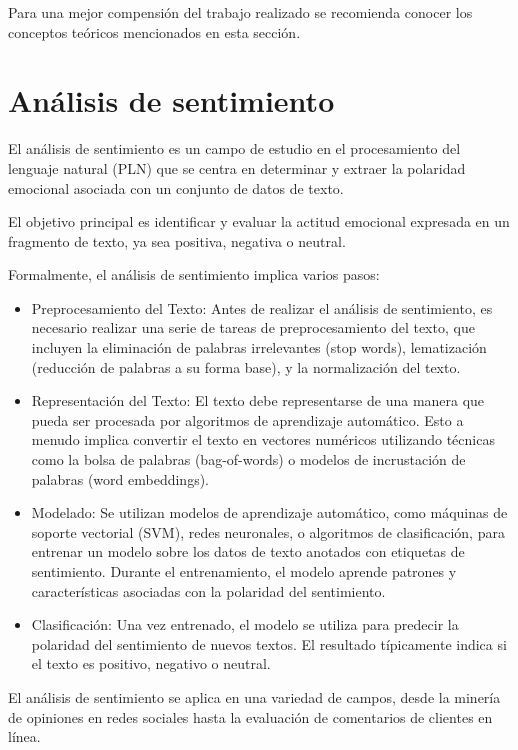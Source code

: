 
Para una mejor compensión del trabajo realizado se recomienda conocer los conceptos teóricos mencionados en esta sección.

\section{Análisis de sentimiento}
El análisis de sentimiento es un campo de estudio en el procesamiento del lenguaje natural (PLN) que se centra en determinar y extraer la polaridad emocional asociada con un conjunto de datos de texto. 

El objetivo principal es identificar y evaluar la actitud emocional expresada en un fragmento de texto, ya sea positiva, negativa o neutral.


Formalmente, el análisis de sentimiento implica varios pasos:
\begin{itemize}
	\item Preprocesamiento del Texto: Antes de realizar el análisis de sentimiento, es necesario realizar una serie de tareas de preprocesamiento del texto, que incluyen la eliminación de palabras irrelevantes (stop words), lematización (reducción de palabras a su forma base), y la normalización del texto.
	\item Representación del Texto: El texto debe representarse de una manera que pueda ser procesada por algoritmos de aprendizaje automático. Esto a menudo implica convertir el texto en vectores numéricos utilizando técnicas como la bolsa de palabras (bag-of-words) o modelos de incrustación de palabras (word embeddings).
	\item Modelado: Se utilizan modelos de aprendizaje automático, como máquinas de soporte vectorial (SVM), redes neuronales, o algoritmos de clasificación, para entrenar un modelo sobre los datos de texto anotados con etiquetas de sentimiento. Durante el entrenamiento, el modelo aprende patrones y características asociadas con la polaridad del sentimiento.
	\item Clasificación: Una vez entrenado, el modelo se utiliza para predecir la polaridad del sentimiento de nuevos textos. El resultado típicamente indica si el texto es positivo, negativo o neutral.
\end{itemize}

El análisis de sentimiento se aplica en una variedad de campos, 
desde la minería de opiniones en redes sociales hasta la 
evaluación de comentarios de clientes en línea. 

